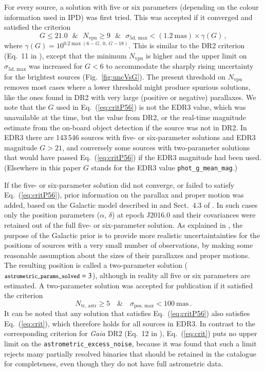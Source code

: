 \documentclass[longauth]{aa} %
\newcommand{\gacs}[1]{{\footnotesize\texttt{#1}}}
\begin{document}
For every source, a solution with five or six parameters (depending on the colour information used in
IPD) was first tried. This was accepted if it converged and satisfied the
criterion
\begin{equation}\label{eq:critP56}
G\le 21.0~~~  \& ~~~ N_\text{vpu}\ge 9 ~~~
\& ~~~ \sigma_\text{5d, max}<(1.2~\text{mas})\times\gamma(G)\, ,
\end{equation}
where $\gamma(G)=10^{0.2\max(6-G,~0,~G-18)}$.
This is similar to the DR2 criterion (Eq.~11 in ), except that the minimum
$N_\text{vpu}$ is higher and the upper limit on $\sigma_\text{5d, max}$ was increased for $G<6$ 
to accommodate the sharply rising uncertainty for the brightest sources (Fig.~\ref{fig:uncVsG}).
The present threshold on $N_\text{vpu}$ removes most cases where a lower threshold might produce 
spurious solutions, like the ones found in DR2 with very large (positive or negative) parallaxes.
We note that the $G$ used in Eq.~(\ref{eq:critP56}) is not the EDR3 value, which was unavailable 
at the time, but the value from DR2, or the real-time magnitude estimate from the on-board 
object detection if the source was not in DR2. In EDR3 there are 143\,546 sources with 
five- or six-parameter solutions and EDR3 magnitude $G > 21$, and conversely some sources with 
two-parameter solutions that would have passed Eq.~(\ref{eq:critP56}) if the EDR3 magnitude
had been used. (Elsewhere in this paper $G$ stands for the EDR3 value \gacs{phot\_g\_mean\_mag}.)

If the five- or six-parameter solution did not converge, 
or failed to satisfy Eq.~(\ref{eq:critP56}), prior information
on the parallax and proper motion was added, based on the Galactic model described in 
 and Sect.~4.3 of . In such
cases only the position parameters ($\alpha$, $\delta$) at epoch J2016.0 and their covariances 
were retained out of the full
five- or six-parameter solution. As explained in , the purpose of 
the Galactic prior is to provide more realistic uncertaintainties for the positions of sources with
a very small number of observations, by making some reasonable assumption about the
sizes of their parallaxes and proper motions. The resulting position is called a two-parameter 
solution ($\gacs{astrometric\_params\_solved}=3$), although 
in reality all five or six parameters are estimated. A two-parameter solution was accepted for 
publication if it satisfied the criterion
\begin{equation}\label{eq:crit}
N_\text{tr, astr}\ge 5 \quad \& \quad \sigma_\text{pos, max}<100~\text{mas} \, .
\end{equation}
It can be noted that any solution that satisfies Eq.~(\ref{eq:critP56}) also satisfies Eq.~(\ref{eq:crit}), 
which therefore holds for all sources in EDR3. In contrast to the corresponding criterion for 
\textit{Gaia} DR2 (Eq.~12 in ), Eq.~(\ref{eq:crit}) puts no upper limit 
on the \gacs{astrometric\_excess\_noise}, because it was found that such a limit rejects many 
partially resolved binaries that should be retained in the catalogue for completeness,
even though they do not have full astrometric data.
\end{document}
